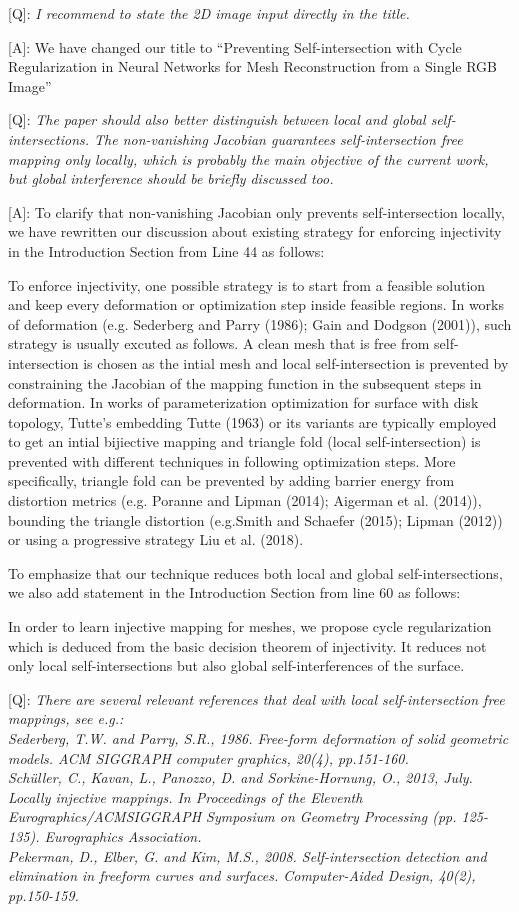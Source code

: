 \documentclass[10pt]{letter} %
\newcommand{\mdf}[1]{\textcolor[rgb]{1.00,0.00,1.00}{#1}}
\begin{document}
	[Q]: \emph{I recommend to state the 2D image input directly in the title.}
	
	[A]: We have changed our title to ``Preventing Self-intersection with Cycle Regularization \mdf{in Neural Networks for Mesh Reconstruction from a Single RGB Image}''
	
	[Q]: \emph{The paper should also better distinguish between local and global self-intersections. The non-vanishing Jacobian guarantees self-intersection free mapping only locally, which is probably the main objective of the current work, but global interference should be briefly discussed too.}
	
	[A]: To clarify that non-vanishing Jacobian only prevents self-intersection locally, we have rewritten our discussion about existing strategy for enforcing injectivity in the Introduction Section from Line 44 as follows:
	
	\mdf{To enforce injectivity, one possible strategy is to start from a feasible solution and keep every deformation or optimization step inside feasible regions. In works of deformation (e.g. Sederberg and Parry (1986); Gain and Dodgson (2001)), such strategy is usually excuted as follows. A clean mesh that is free from self-intersection is chosen as the intial mesh and local self-intersection is prevented by constraining the Jacobian of the mapping function in the subsequent steps in deformation. In works of parameterization optimization for surface with disk topology, Tutte’s embedding Tutte (1963) or its variants are typically employed to get an intial bijiective mapping and triangle fold (local self-intersection) is prevented with different techniques in following optimization steps. More specifically, triangle fold can be prevented by adding barrier energy from distortion metrics (e.g. Poranne and Lipman (2014); Aigerman et al. (2014)), bounding the triangle distortion (e.g.Smith and Schaefer (2015); Lipman (2012)) or using a progressive strategy Liu et al. (2018).}
	
	To emphasize that our technique reduces both local and global self-intersections, we also add statement in the Introduction Section from line 60 as follows:
	
	In order to learn injective mapping for meshes, \mdf{we propose cycle regularization which is deduced from the basic decision theorem of injectivity. It reduces not only local self-intersections but also global self-interferences of the surface.}
	
	[Q]: 
	\emph{There are several relevant references that deal with local self-intersection free mappings, see e.g.:\\
	Sederberg, T.W. and Parry, S.R., 1986. Free-form deformation of solid geometric models. ACM SIGGRAPH computer graphics, 20(4), pp.151-160.\\
	Schüller, C., Kavan, L., Panozzo, D. and Sorkine-Hornung, O., 2013, July. Locally injective mappings. In Proceedings of the Eleventh Eurographics/ACMSIGGRAPH Symposium on Geometry Processing (pp. 125-135). Eurographics Association.\\
	Pekerman, D., Elber, G. and Kim, M.S., 2008. Self-intersection detection and elimination in freeform curves and surfaces. Computer-Aided Design, 40(2), pp.150-159.}
\end{document}
